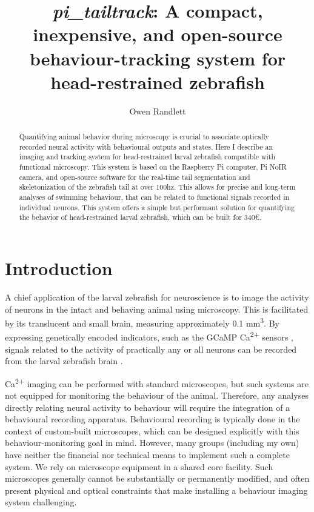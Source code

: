 \documentclass[9pt,lineno]{RandlettLab_elife}
\title{\emph{pi\_tailtrack}: A compact, inexpensive, and open-source behaviour-tracking system for head-restrained zebrafish}
\author[1]{Owen Randlett}
\affil[1]{
Laboratoire MeLiS, UCBL - CNRS UMR5284 - Inserm U1314, Institut NeuroMyoGène, Faculté de Médecine et de Pharmacie, 8 avenue Rockefeller, 69008, Lyon, France 
}
\begin{document}
\maketitle
\begin{abstract}

Quantifying animal behavior during microscopy is crucial to associate optically recorded neural activity with behavioural outputs and states. Here I describe an imaging and tracking system for head-restrained larval zebrafish compatible with functional microscopy. This system is based on the Raspberry Pi computer, Pi NoIR camera, and open-source software for the real-time tail segmentation and skeletonization of the zebrafish tail at over 100hz. This allows for precise and long-term analyses of swimming behaviour, that can be related to functional signals recorded in individual neurons. This system offers a simple but performant solution for quantifying the behavior of head-restrained larval zebrafish, which can be built for 340€.

\end{abstract}

\section{Introduction}

A chief application of the larval zebrafish for neuroscience is to image the activity of neurons in the intact and behaving animal using microscopy. This is facilitated by its translucent and small brain, measuring approximately 0.1 mm\textsuperscript{3}. By expressing genetically encoded indicators, such as the GCaMP Ca\textsuperscript{2+} sensors \citep{Akerboom2012, Chen2013}, signals related to the activity of practically any or all neurons can be recorded from the larval zebrafish brain \citep{Ahrens2012, Portugues2014}. 

Ca\textsuperscript{2+} imaging can be performed with standard microscopes, but such systems are not equipped for monitoring the behaviour of the animal. Therefore, any analyses directly relating neural activity to behaviour will require the integration of a behavioural recording apparatus. Behavioural recording is typically done in the context of custom-built microscopes, which can be designed explicitly with this behaviour-monitoring goal in mind. However, many groups (including my own) have neither the financial nor technical means to implement such a complete system. We rely on microscope equipment in a shared core facility. Such microscopes generally cannot be substantially or permanently modified, and often present physical and optical constraints that make installing a behaviour imaging system challenging. 
\end{document}
